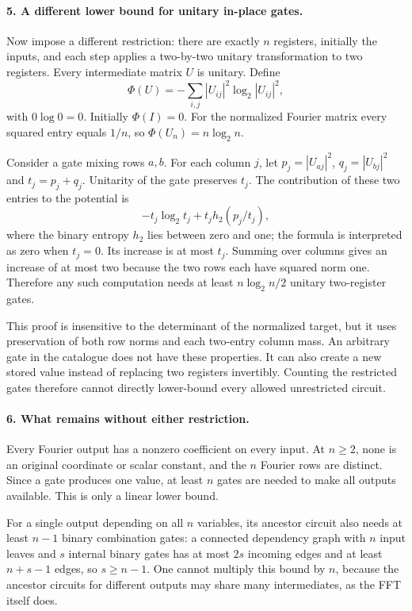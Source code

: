 \documentclass[11pt]{article}
\begin{document}
\paragraph{5. A different lower bound for unitary in-place gates.}
Now impose a different restriction: there are exactly $n$ registers, initially the inputs, and each step applies a two-by-two unitary transformation to two registers. Every intermediate matrix $U$ is unitary. Define
\[
 \Phi(U)=-\sum_{i,j}|U_{ij}|^2\log_2|U_{ij}|^2,
\]
with $0\log0=0$. Initially $\Phi(I)=0$. For the normalized Fourier matrix every squared entry equals $1/n$, so $\Phi(U_n)=n\log_2n$.

Consider a gate mixing rows $a,b$. For each column $j$, let $p_j=|U_{aj}|^2$, $q_j=|U_{bj}|^2$ and $t_j=p_j+q_j$. Unitarity of the gate preserves $t_j$. The contribution of these two entries to the potential is
\[
 -t_j\log_2t_j+t_j h_2(p_j/t_j),
\]
where the binary entropy $h_2$ lies between zero and one; the formula is interpreted as zero when $t_j=0$. Its increase is at most $t_j$. Summing over columns gives an increase of at most two because the two rows each have squared norm one. Therefore any such computation needs at least $n\log_2n/2$ unitary two-register gates.

This proof is insensitive to the determinant of the normalized target, but it uses preservation of both row norms and each two-entry column mass. An arbitrary gate in the catalogue does not have these properties. It can also create a new stored value instead of replacing two registers invertibly. Counting the restricted gates therefore cannot directly lower-bound every allowed unrestricted circuit.

\paragraph{6. What remains without either restriction.}
Every Fourier output has a nonzero coefficient on every input. At $n\ge2$, none is an original coordinate or scalar constant, and the $n$ Fourier rows are distinct. Since a gate produces one value, at least $n$ gates are needed to make all outputs available. This is only a linear lower bound.

For a single output depending on all $n$ variables, its ancestor circuit also needs at least $n-1$ binary combination gates: a connected dependency graph with $n$ input leaves and $s$ internal binary gates has at most $2s$ incoming edges and at least $n+s-1$ edges, so $s\ge n-1$. One cannot multiply this bound by $n$, because the ancestor circuits for different outputs may share many intermediates, as the FFT itself does.
\end{document}
